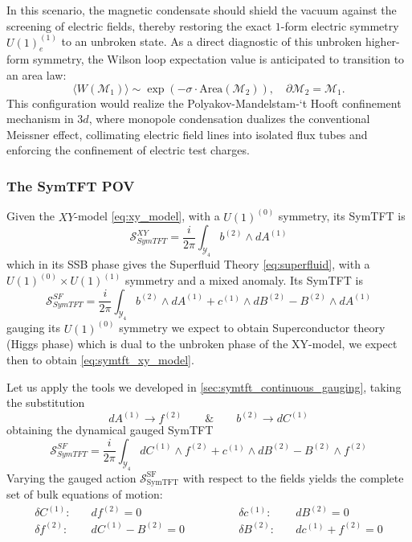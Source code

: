 \documentclass[aps,preprint,nofootinbib,preprintnumbers,eqsecnum,superscriptaddress]{revtex4}
\numberwithin{equation}{section}
\begin{document}
In this scenario, the magnetic condensate should shield the vacuum against the screening of electric fields, thereby restoring the exact $1$-form electric symmetry $U(1)_e^{(1)}$ to an unbroken state. As a direct diagnostic of this unbroken higher-form symmetry, the Wilson loop expectation value is anticipated to transition to an area law:\begin{equation}\langle W(\mathcal{M}_1) \rangle \sim \exp\left(-\sigma \cdot \text{Area}(\mathcal{M}_2)\right), \quad \partial\mathcal{M}_2 = \mathcal{M}_1.\end{equation}This configuration would realize the Polyakov-Mandelstam-`t Hooft confinement mechanism in $3d$, where monopole condensation dualizes the conventional Meissner effect, collimating electric field lines into isolated flux tubes and enforcing the confinement of electric test charges.

\subsubsection{The SymTFT POV}
Given the $XY$-model \ref{eq:xy_model}, with a $U(1)^{(0)}$ symmetry, its SymTFT is
\begin{equation}\label{eq:symtft_xy_model}
    \mathcal{S}^{XY}_{SymTFT} = \frac{i}{2\pi} \int_{\mathcal{Y}_4} b^{(2)} \wedge dA^{(1)}
\end{equation}
which in its SSB phase gives the Superfluid Theory  \ref{eq:superfluid}, with a $U(1)^{(0)} \times U(1)^{(1)}$ symmetry and a mixed anomaly. Its SymTFT is
\begin{equation}
    \mathcal{S}^{SF}_{SymTFT} = \frac{i}{2\pi} \int_{\mathcal{Y}_4} b^{(2)} \wedge dA^{(1)} + c^{(1)} \wedge dB^{(2)} - B^{(2)} \wedge dA^{(1)}
\end{equation}
gauging its $U(1)^{(0)}$ symmetry we expect to obtain Superconductor theory (Higgs phase) which is dual to the unbroken phase of the XY-model, we expect then to obtain \ref{eq:symtft_xy_model}.

Let us apply the tools we developed in \ref{sec:symtft_continuous_gauging}, taking the substitution
\begin{equation}
    dA^{(1)} \to f^{(2)} \qquad \& \qquad b^{(2)} \to dC^{(1)}
\end{equation}
obtaining the dynamical gauged SymTFT
\begin{equation}
    \mathcal{S}^{SF}_{SymTFT} = \frac{i}{2\pi} \int_{\mathcal{Y}_4} dC^{(1)} \wedge f^{(2)} + c^{(1)} \wedge dB^{(2)} - B^{(2)} \wedge f^{(2)}
\end{equation}
Varying the gauged action $\mathcal{S}^{\text{SF}}_{\text{SymTFT}}$ with respect to the fields yields the complete set of bulk equations of motion: 
\begin{align}
    \delta C^{(1)}: & \quad df^{(2)} = 0  \qquad & \qquad
    \delta c^{(1)}: & \quad dB^{(2)} = 0  \\
    \delta f^{(2)}: & \quad dC^{(1)} - B^{(2)} = 0   \qquad & \qquad
    \delta B^{(2)}: & \quad dc^{(1)} + f^{(2)} = 0 
\end{align}
\end{document}

